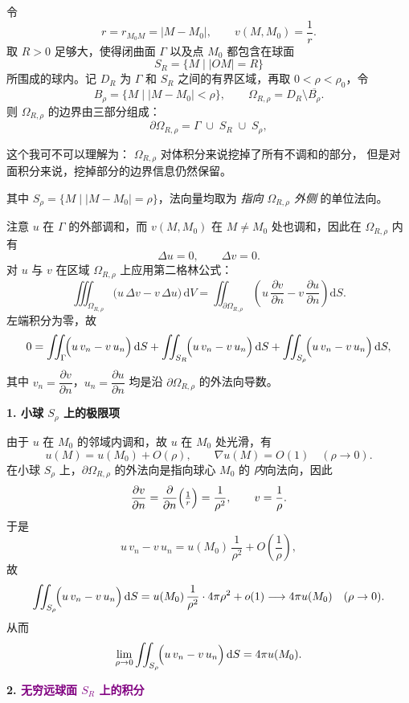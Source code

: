 \begin{solution}
令
\[
r=r_{M_0M}=|M-M_0|,\qquad
v(M,M_0)=\frac{1}{r}.
\]
取 $R>0$ 足够大，使得闭曲面 $\Gamma$ 以及点 $M_0$ 都包含在球面
\[
S_R=\{M\mid |OM|=R\}
\]
所围成的球内。记 $D_R$ 为 $\Gamma$ 和 $S_R$ 之间的有界区域，再取 $0<\rho<\rho_0$，令
\[
B_\rho=\{M\mid |M-M_0|<\rho\},\qquad 
\Omega_{R,\rho}=D_R\setminus \overline{B_\rho}.
\]
则 $\Omega_{R,\rho}$ 的边界由三部分组成：
\[
\partial\Omega_{R,\rho}=\Gamma\;\cup\;S_R\;\cup\;S_\rho,
\]
\begin{dxtips}
    这个我可不可以理解为：
\(\Omega_{R,\rho}\) 对体积分来说挖掉了所有不调和的部分，
但是对面积分来说，挖掉部分的边界信息仍然保留。
\end{dxtips}
其中 $S_\rho=\{M\mid |M-M_0|=\rho\}$，法向量均取为 \emph{指向 $\Omega_{R,\rho}$ 外侧} 的单位法向。

注意 $u$ 在 $\Gamma$ 的外部调和，而 $v(M,M_0)$ 在 $M\neq M_0$ 处也调和，因此在 $\Omega_{R,\rho}$ 内有
\[
\Delta u=0,\qquad \Delta v=0.
\]
对 $u$ 与 $v$ 在区域 $\Omega_{R,\rho}$ 上应用第二格林公式：
\[
\iiint_{\Omega_{R,\rho}} \bigl(u\,\Delta v - v\,\Delta u\bigr)\,\mathrm dV
= \iint_{\partial\Omega_{R,\rho}}
\left(
  u\,\frac{\partial v}{\partial n}
  - v\,\frac{\partial u}{\partial n}
\right)\mathrm dS.
\]
左端积分为零，故
\[
0
= \iint_{\Gamma}\!\Bigl(u\,v_n - v\,u_n\Bigr)\,\mathrm dS
 +\iint_{S_R}\!\Bigl(u\,v_n - v\,u_n\Bigr)\,\mathrm dS
 +\iint_{S_\rho}\!\Bigl(u\,v_n - v\,u_n\Bigr)\,\mathrm dS,
\]
其中 $v_n=\dfrac{\partial v}{\partial n}$，$u_n=\dfrac{\partial u}{\partial n}$ 均是沿 $\partial\Omega_{R,\rho}$ 的外法向导数。

\medskip
\noindent\textbf{1. 小球 $S_\rho$ 上的极限项}

由于 $u$ 在 $M_0$ 的邻域内调和，故 $u$ 在 $M_0$ 处光滑，有
\[
u(M)=u(M_0)+O(\rho),\qquad
\nabla u(M)=O(1)\quad (\rho\to0).
\]
在小球 $S_\rho$ 上，$\partial\Omega_{R,\rho}$ 的外法向是指向球心 $M_0$ 的 \emph{内}向法向，因此
\[
\frac{\partial v}{\partial n}
=\frac{\partial}{\partial n}\Bigl(\tfrac{1}{r}\Bigr)
= \frac{1}{\rho^2},\qquad
v=\frac{1}{\rho}.
\]
于是
\[
u\,v_n - v\,u_n
= u(M_0)\,\frac{1}{\rho^2} + O\!\left(\frac{1}{\rho}\right),
\]
故
\[
\iint_{S_\rho}\!\Bigl(u\,v_n - v\,u_n\Bigr)\,\mathrm dS
= u(M_0)\,\frac{1}{\rho^2}\cdot 4\pi\rho^2 + o(1)
\longrightarrow 4\pi u(M_0)\quad(\rho\to0).
\]
从而
\[
\lim_{\rho\to0}
\iint_{S_\rho}\!\Bigl(u\,v_n - v\,u_n\Bigr)\,\mathrm dS
=4\pi u(M_0).
\]

\medskip
\noindent\textbf{2.\textcolor{purple}{ 无穷远球面 $S_R$ 上的积分}}


\end{solution}
